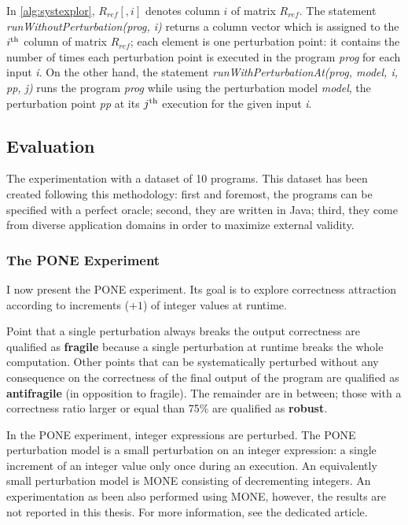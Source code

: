 In \autoref{alg:systexplor}, $R_{ref}[,i]$ denotes column $i$ of matrix $R_{ref}$. 
The statement \emph{runWithoutPerturbation(prog, i)} returns a column vector which is assigned to the $i^{\mbox{\scriptsize th}}$ column of matrix $R_{ref}$; each element is one perturbation point: it contains the number of times each perturbation point is executed in the program \emph{prog} for each input \emph{i}. 
On the other hand, the statement \emph{runWithPerturbationAt(prog, model, i, pp, j)} runs the program \emph{prog} while using the perturbation model \emph{model}, the perturbation point \emph{pp} at its $j^{\mbox{\scriptsize th}}$ execution for the given input \emph{i}.

\subsection{Evaluation}
\label{subsec:transversal-contributions:correctness:experimentation}

The experimentation with a dataset of 10 programs. 
This dataset has been created following this methodology:
first and foremost, the programs can be specified with a perfect oracle;
second, they are written in Java;
third, they come from diverse application domains in order to maximize external validity.

\subsubsection{The PONE Experiment}
\label{subsubsec:transversal-contributions:correctness:experimentation:PONE}

I now present the PONE experiment. 
Its goal is to explore correctness attraction according to increments ($+ 1$) of integer values at runtime.

Point that a single perturbation always breaks the output correctness are qualified as \textbf{fragile} because a single perturbation at runtime breaks the whole computation.
Other points that can be systematically perturbed without any consequence on the correctness of the final output of the program are qualified as \textbf{antifragile} (in opposition to fragile).
The remainder are in between; those with a correctness ratio larger or equal than 75\% are qualified as \textbf{robust}.

In the PONE experiment, integer expressions are perturbed.
The PONE perturbation model is a small perturbation on an integer expression: a single increment of an integer value only once during an execution. 
An equivalently small perturbation model is MONE consisting of decrementing integers. 
An experimentation as been also performed using MONE, however, the results are not reported in this thesis.
For more information, see the dedicated article.\cite{Danglot2018}

